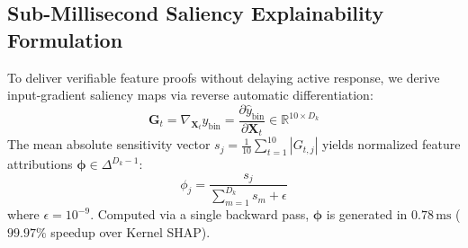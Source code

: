 \documentclass[11pt,a4paper]{article}
\begin{document}
\begin{table}[h]
\centering
\caption{Hyperparameter Configuration for Conformer-Sentinel Neural Core}
\label{tab:hyperparameters}
\end{table}

\subsection{Sub-Millisecond Saliency Explainability Formulation}
To deliver verifiable feature proofs without delaying active response, we derive input-gradient saliency maps via reverse automatic differentiation:
\begin{equation}
    \mathbf{G}_t = \nabla_{\mathbf{X}_t} \hat{y}_{\text{bin}} = \frac{\partial \hat{y}_{\text{bin}}}{\partial \mathbf{X}_t} \in \mathbb{R}^{10 \times D_k}
\end{equation}
The mean absolute sensitivity vector $s_j = \frac{1}{10} \sum_{t=1}^{10} |G_{t, j}|$ yields normalized feature attributions $\boldsymbol{\phi} \in \Delta^{D_k-1}$:
\begin{equation}
    \phi_j = \frac{s_j}{\sum_{m=1}^{D_k} s_m + \epsilon}
\end{equation}
where $\epsilon = 10^{-9}$. Computed via a single backward pass, $\boldsymbol{\phi}$ is generated in $0.78\,\text{ms}$ ($99.97\%$ speedup over Kernel SHAP).
\end{document}
